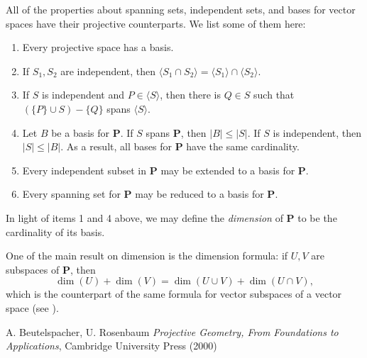 \documentclass[12pt]{article}
\begin{document}
All of the properties about spanning sets, independent sets, and bases for vector spaces have their projective counterparts.  We list some of them here:
\begin{enumerate}
\item Every projective space has a basis.
\item If $S_1,S_2$ are independent, then $\langle S_1\cap S_2\rangle = \langle S_1\rangle \cap \langle S_2\rangle$.
\item If $S$ is independent and $P\in \langle S\rangle$, then there is $Q\in S$ such that $(\lbrace P\rbrace \cup S)-\lbrace Q\rbrace $ spans $\langle S\rangle$.
\item Let $B$ be a basis for $\mathbf{P}$.  If $S$ spans $\mathbf{P}$, then $|B|\le |S|$.  If $S$ is independent, then $|S|\le |B|$.  As a result, all bases for $\mathbf{P}$ have the same cardinality.
\item Every independent subset in $\mathbf{P}$ may be extended to a basis for $\mathbf{P}$.
\item Every spanning set for $\mathbf{P}$ may be reduced to a basis for $\mathbf{P}$.
\end{enumerate}

In light of items 1 and 4 above, we may define the \emph{dimension} of $\mathbf{P}$ to be the cardinality of its basis.

One of the main result on dimension is the dimension formula: if $U,V$ are subspaces of $\mathbf{P}$, then
$$\dim(U)+\dim(V)=\dim(U\cup V)+\dim(U\cap V),$$
which is the counterpart of the same formula for vector subspaces of a vector space (see ).

\begin{thebibliography}{6}
 A. Beutelspacher, U. Rosenbaum {\it Projective Geometry, From Foundations to Applications}, Cambridge University Press (2000)
\end{thebibliography}
\end{document}
